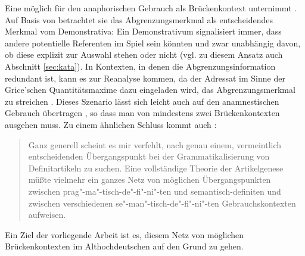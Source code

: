 Eine möglich  für den anaphorischen Gebrauch als Brückenkontext unternimmt  
\textcite{Schlachter2015}. Auf Basis von \textcite{Bisle-Muller1991} betrachtet sie das Abgrenzungsmerkmal als entscheidendes Merkmal vom Demonstrativa: Ein Demonstrativum signalisiert immer, dass andere potentielle Referenten im Spiel sein könnten und zwar unabhängig davon, ob diese explizit zur Auswahl stehen oder nicht (vgl. zu diesem Ansatz auch  Abschnitt \ref{sec:kata}). In Kontexten, in denen die Abgrenzungsinformation redundant ist, kann es zur Reanalyse kommen, da der Adressat im Sinne der Grice'schen Quantitätsmaxime \parencite[Mache deinen Beitrag nicht informativer als notwendig,][]{Grice1975} dazu eingeladen wird, das Abgrenzungsmerkmal zu streichen \parencite{Schlachter2015}. Dieses Szenario lässt sich leicht auch auf den anamnestischen Gebrauch übertragen \parencite[s. hierzu][]{Schlachter2015}, so dass man von mindestens zwei Brückenkontexten ausgehen muss. Zu einem ähnlichen Schluss kommt auch \textcite{Himmelmann1997}: 

\blockcquote[96]{Himmelmann1997}{
Ganz generell scheint es mir verfehlt, nach genau einem, vermeintlich entscheidenden
Übergangspunkt bei der Grammatikalisierung von Definitartikeln zu suchen. Eine vollständige
Theorie der Artikelgenese müßte vielmehr ein ganzes Netz von möglichen Übergangspunkten
zwischen prag"-ma"-tisch-de"-fi"-ni"-ten und semantisch-definiten und zwischen verschiedenen
se"-man"-tisch-de"-fi"-ni"-ten Gebrauchskontexten aufweisen.} 

\noindent
Ein Ziel der vorliegende Arbeit ist es, diesem Netz von möglichen Brückenkontexten im Althochdeutschen auf den Grund zu gehen. 

